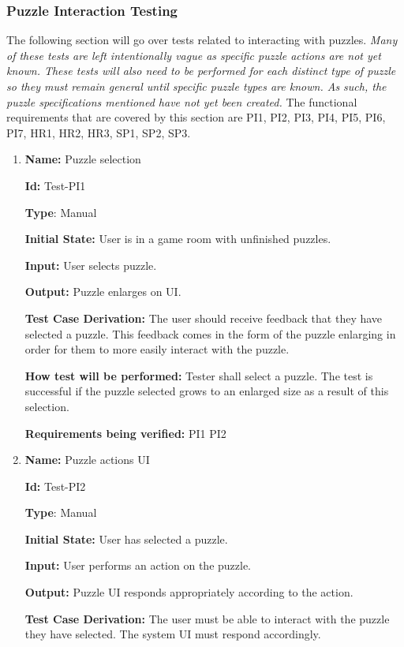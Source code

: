 \documentclass[12pt, titlepage]{article}
\begin{document}
\subsubsection{Puzzle Interaction Testing}
The following section will go over tests related to interacting with puzzles.
\textit{Many of these tests are left intentionally vague as specific puzzle actions are not yet known. These tests will also need to be performed for each distinct type of puzzle so they must remain general until specific puzzle types are known. As such, the puzzle specifications mentioned have not yet been created. } The functional requirements that are covered by this section are PI1, PI2, PI3, PI4, PI5, PI6, PI7, HR1, HR2, HR3, SP1, SP2, SP3.

\begin{enumerate}

\item{\textbf{Name:} Puzzle selection} \label{itm:Test-PI1}

\textbf{Id:} Test-PI1

\textbf{Type}: Manual

\textbf{Initial State:} User is in a game room with unfinished puzzles.

\textbf{Input:} User selects puzzle.

\textbf{Output:} Puzzle enlarges on UI.

\textbf{Test Case Derivation:}
The user should receive feedback that they have selected a puzzle. This feedback comes in the form of the puzzle enlarging in order for them to more easily interact with the puzzle. 

\textbf{How test will be performed:}
Tester shall select a puzzle. The test is successful if the puzzle selected grows to an enlarged size as a result of this selection.

\textbf{Requirements being verified: } PI1 PI2

\item{\textbf{Name:} Puzzle actions UI} \label{itm:Test-PI2}

\textbf{Id:} Test-PI2

\textbf{Type}: Manual

\textbf{Initial State:} User has selected a puzzle.

\textbf{Input:} User performs an action on the puzzle.

\textbf{Output:} Puzzle UI responds appropriately according to the action.

\textbf{Test Case Derivation:}
The user must be able to interact with the puzzle they have selected. The system UI must respond accordingly.


\end{enumerate}
\end{document}
